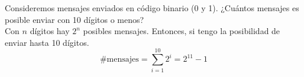 \item Consideremos mensajes enviados en código binario (0 y 1). ¿Cuántos mensajes es posible enviar con 10 dígitos o menos?\e\\
    Con $n$ dígitos hay $2^n$ posibles mensajes. Entonces, si tengo la posibilidad de enviar hasta 10 dígitos.
    \[\#\text{mensajes}=\sum\limits_{i=1}^{10}2^i=2^{11}-1\] 